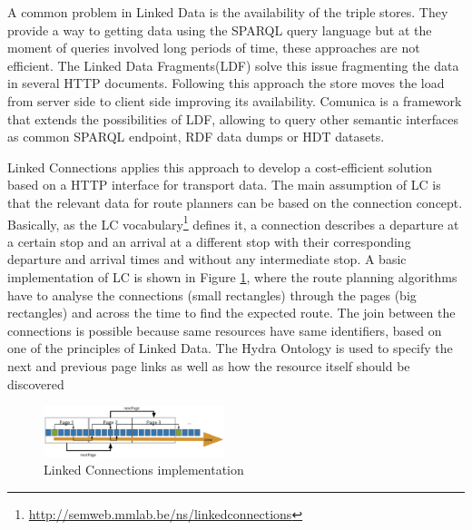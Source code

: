 \documentclass[sw]{iosart2x}
\begin{document}
A common problem in Linked Data is the availability of the triple stores. They provide a way to getting data using the SPARQL query language but at the moment of queries involved long periods of time, these approaches are not efficient\cite{verborgh2014querying}. The Linked Data Fragments(LDF)\cite{verborgh2016triple,verborgh2014web} solve this issue fragmenting the data in several HTTP documents. Following this approach the store moves the load from server side to client side improving its availability. Comunica\cite{taelman2018comunica} is a framework that extends the possibilities of LDF, allowing to query other semantic interfaces as common SPARQL endpoint, RDF data dumps or HDT datasets\cite{fernandez2013binary}. 

Linked Connections\cite{colpaert2015intermodal} applies this approach to develop a cost-efficient solution based on a HTTP interface for transport data. The main assumption of LC is that the relevant data for route planners can be based on the connection concept. Basically, as the LC vocabulary\footnote{\url{http://semweb.mmlab.be/ns/linkedconnections}} defines it, a connection describes a departure at a certain stop and an arrival at a different stop with their corresponding departure and arrival times and without any intermediate stop. A basic implementation of LC is shown in Figure \ref{fig:lc_imp}, where the route planning algorithms have to analyse the connections (small rectangles) through the pages (big rectangles) and across the time to find the expected route. The join between the connections is possible because same resources have same identifiers, based on one of the principles of Linked Data. The Hydra Ontology\cite{lanthaler2013hydra} is used to specify the next and previous page links as well as how the resource itself should be discovered


\begin{figure}[t]
	\includegraphics[width=0.47\textwidth]{images/implementation.png}
	\caption{Linked Connections implementation}\label{fig:lc_imp}
\end{figure}
\end{document}
